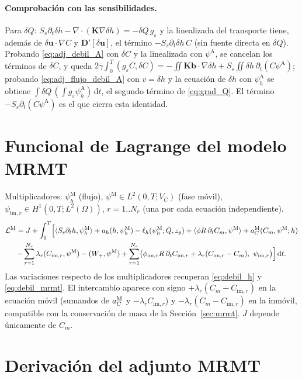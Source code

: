 \documentclass[11pt]{article}
\numberwithin{equation}{section}
\theoremstyle{remark}
\newcommand{\bu}{\mathbf{u}}
\newcommand{\bK}{\mathbf{K}}
\newcommand{\bD}{\mathbf{D}}
\newcommand{\bb}{\mathbf{b}}
\newcommand{\geps}{g_\varepsilon}
\newcommand{\im}{\mathrm{im}}
\newcommand{\pA}{\psi^{\mathrm{A}}}    %
\newcommand{\pM}{\psi^{\mathrm{M}}}    %
\newcommand{\pim}{\psi_{\im,r}}          %
\newcommand{\ph}[1]{\psi_h^{\mathrm{#1}}}  %
\newcommand{\dd}{\,\mathrm{d}}
\begin{document}
\paragraph{Comprobaci\'on con las sensibilidades.} Para $\delta Q$: $S_s\partial_t\delta h-\nabla\!\cdot(\bK\nabla\delta h)=-\delta Q\,\geps$ y la linealizada del transporte tiene, adem\'as de $\delta\bu\cdot\nabla C$ y $\bD'[\delta\bu]$, el t\'ermino
$-S_s\partial_t\delta h\,C$ (sin fuente directa en $\delta Q$). Probando \eqref{eq:adj_debil_A} con $\delta C$ y la linealizada con $\pA$, se cancelan los t\'erminos de $\delta C$, y queda
$2\gamma\int_0^T(\geps C,\delta C)=-\iint\bK\bb\cdot\nabla\delta h+S_s\iint\delta h\,\partial_t(C\pA)$; probando \eqref{eq:adj_flujo_debil_A} con $v=\delta h$ y la ecuaci\'on de $\delta h$ con $\ph{A}$ se obtiene
$\int\delta Q\,(\int\geps\ph{A})\dd t$, el segundo t\'ermino de \eqref{eq:grad_Q}. El t\'ermino $-S_s\partial_t(C\pA)$ es el que cierra esta identidad.

\section{Funcional de Lagrange del modelo MRMT}
\label{sec:L_MRMT}

Multiplicadores: $\ph{M}$ (flujo), $\pM\in L^2(0,T;V_C)$ (fase m\'ovil), $\pim\in H^1(0,T;L^2(\Omega))$, $r=1..N_r$ (una por cada ecuaci\'on independiente).
\begin{multline}
\mathcal{L}^{\mathrm M}=J+\int_0^T\Bigl[\langle S_s\partial_th,\ph{M}\rangle+a_h(h,\ph{M})-\ell_h(\ph{M};Q,z_p)
+\langle\phi R\,\partial_tC_m,\pM\rangle+a_C^{\mathrm M}(C_m,\pM;h)\\
-\sum_{r=1}^{N_r}\lambda_r(C_{\im,r},\pM)-(W_+,\pM)
+\sum_{r=1}^{N_r}\bigl(\phi_{\im,r}R\,\partial_tC_{\im,r}+\lambda_r(C_{\im,r}-C_m),\ \pim\bigr)\Bigr]\dd t .
\label{eq:L_MRMT}
\end{multline}
Las variaciones respecto de los multiplicadores recuperan \eqref{eq:debil_h} y \eqref{eq:debil_mrmt}. El intercambio aparece con signo $+\lambda_r(C_m-C_{\im,r})$ en la ecuaci\'on m\'ovil (sumandos de $a_C^{\rm M}$ y $-\lambda_rC_{\im,r}$) y
$-\lambda_r(C_m-C_{\im,r})$ en la inm\'ovil, compatible con la conservaci\'on de masa de la Secci\'on~\ref{sec:mrmt}. $J$ depende \'unicamente de $C_m$.

\section{Derivaci\'on del adjunto MRMT}
\label{sec:adj_MRMT}
\end{document}
